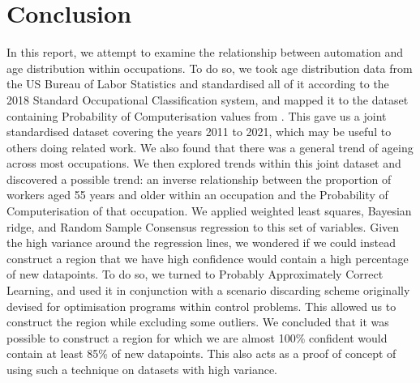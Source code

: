 \documentclass[11pt]{article}
\begin{document}
\clearpage

\section{Conclusion}
\label{sec:Conclusion}
In this report, we attempt to examine the relationship between automation and age distribution within occupations. To do so, we took age distribution data from the US Bureau of Labor Statistics and standardised all of it according to the 2018 Standard Occupational Classification system, and mapped it to the dataset containing Probability of Computerisation values from \cite{osborne2017future}. This gave us a joint standardised dataset covering the years 2011 to 2021, which may be useful to others doing related work. We also found that there was a general trend of ageing across most occupations. We then explored trends within this joint dataset and discovered a possible trend: an inverse relationship between the proportion of workers aged 55 years and older within an occupation and the Probability of Computerisation of that occupation. We applied weighted least squares, Bayesian ridge, and Random Sample Consensus regression to this set of variables. Given the high variance around the regression lines, we wondered if we could instead construct a region that we have high confidence would contain a high percentage of new datapoints. To do so, we turned to Probably Approximately Correct Learning, and used it in conjunction with a scenario discarding scheme originally devised for optimisation programs within control problems. This allowed us to construct the region while excluding some outliers. We concluded that it was possible to construct a region for which we are almost 100\% confident would contain at least 85\% of new datapoints. This also acts as a proof of concept of using such a technique on datasets with high variance.
\end{document}
